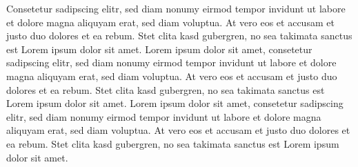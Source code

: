\documentclass[12pt,a4paper,twoside]{report}
\begin{document}
Consetetur sadipscing elitr, sed diam nonumy eirmod tempor invidunt ut
labore et dolore magna aliquyam erat, sed diam voluptua. At vero eos
et accusam et justo duo dolores et ea rebum. Stet clita kasd
gubergren, no sea takimata sanctus est Lorem ipsum dolor sit amet.
Lorem ipsum dolor sit amet, consetetur sadipscing elitr, sed diam
nonumy eirmod tempor invidunt ut labore et dolore magna aliquyam erat,
sed diam voluptua. At vero eos et accusam et justo duo dolores et ea
rebum. Stet clita kasd gubergren, no sea takimata sanctus est Lorem
ipsum dolor sit amet. Lorem ipsum dolor sit amet, consetetur
sadipscing elitr, sed diam nonumy eirmod tempor invidunt ut labore et
dolore magna aliquyam erat, sed diam voluptua. At vero eos et accusam
et justo duo dolores et ea rebum. Stet clita kasd gubergren, no sea
takimata sanctus est Lorem ipsum dolor sit amet.
\fi

\label{lastpage}
\end{document}
